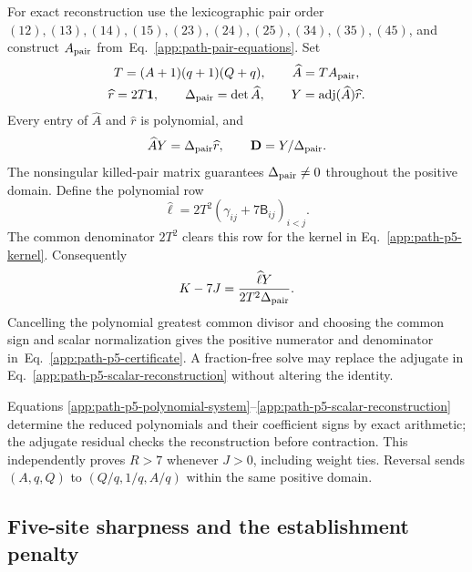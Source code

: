 \documentclass[aps,pre,reprint,amsmath,amssymb,longbibliography]{revtex4-2}
\begin{document}
For exact reconstruction use the
lexicographic pair order
$(12),(13),(14),(15),(23),(24),(25),(34),(35),(45)$,
and construct $A_{\rm pair}$ from~Eq.~\eqref{app:path-pair-equations}.
Set
\begin{equation}
 \begin{gathered}
 T=(A+1)(q+1)(Q+q),\qquad \widehat A=T A_{\rm pair},\\
 \widehat r=2T\mathbf1,\qquad \Delta_{\rm pair}=\det\widehat A,\qquad
 Y=\operatorname{adj}(\widehat A)\widehat r.
 \end{gathered}
 \label{app:path-p5-polynomial-system}
\end{equation}
Every entry of $\widehat A$ and $\widehat r$ is polynomial, and
\begin{equation}
 \widehat AY=\Delta_{\rm pair}\widehat r,\qquad \mathbf D=Y/\Delta_{\rm pair}.
 \label{app:path-p5-reconstruction-residual}
\end{equation}
The nonsingular killed-pair matrix guarantees $\Delta_{\rm pair}\ne0$ throughout
the positive domain. Define the polynomial row
\begin{equation}
 \widehat\ell=2T^2(\gamma_{ij}+7\mathsf B_{ij})_{i<j}.
 \label{app:path-p5-contraction-row}
\end{equation}
The common denominator $2T^2$ clears this row for the kernel in
Eq.~\eqref{app:path-p5-kernel}. Consequently
\begin{equation}
 K-7J=\frac{\widehat\ell Y}{2T^2\Delta_{\rm pair}}.
 \label{app:path-p5-scalar-reconstruction}
\end{equation}
Cancelling the polynomial greatest common divisor and choosing the
common sign and scalar normalization gives the positive numerator
and denominator in~Eq.~\eqref{app:path-p5-certificate}. A fraction-free
solve may replace the adjugate in Eq.~\eqref{app:path-p5-scalar-reconstruction}
without altering the identity.

Equations \eqref{app:path-p5-polynomial-system}--\eqref{app:path-p5-scalar-reconstruction}
determine the reduced polynomials and their coefficient signs by exact
arithmetic; the adjugate residual checks the reconstruction before contraction.
This independently proves $R>7$ whenever $J>0$, including weight ties.
Reversal sends $(A,q,Q)$ to $(Q/q,1/q,A/q)$ within the same positive domain.

\subsection{Five-site sharpness and the establishment penalty}
\label{app:path-p5-sharpness}
\end{document}
